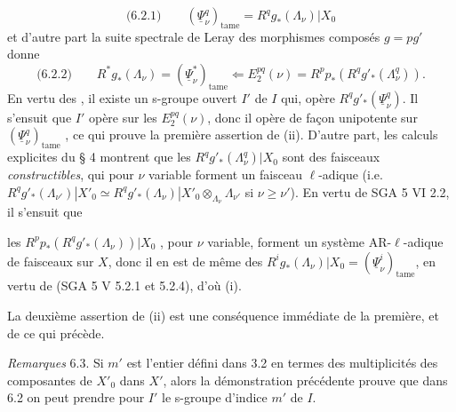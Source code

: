 \documentclass[11pt,a4paper]{article}
\begin{document}
\[
\text{(6.2.1)} \qquad (\underline{\Psi}^q_\nu)_{\mathrm{tame}} = R^q g_*(\Lambda_\nu)|X_0
\]
et  d'autre part la suite spectrale de Leray des morphismes composés $g = p g'$ donne
\[
\text{(6.2.2)} \qquad R^* g_*(\Lambda_\nu) = (\underline{\Psi}^*_\nu)_{\mathrm{tame}} \Longleftarrow E_2^{pq}(\nu) = R^p p_*(R^q g'_*(\Lambda^q_\nu)) .
\]
En vertu des \struck{\ill{}} , il existe un s-groupe ouvert $I'$ de $I$ qui,  opère   $R^q g'_*(\underline{\Psi}^q_\nu)$. Il s'ensuit que $I'$ opère \struck{\ill{}}   sur  les $E_2^{pq}(\nu)$, donc  il opère de façon unipotente   sur $(\underline{\Psi}^q_\nu)_{\mathrm{tame}}$  , ce qui prouve la première assertion de (ii).
D'autre part, les calculs explicites du § 4 montrent que les $R^q g'_*(\Lambda^q_\nu)|X_0$ sont des faisceaux \emph{constructibles}, qui pour $\nu$ variable forment un faisceau \struck{\ill{}} $\ell$-adique (i.e. $R^q g'_*(\Lambda_{\nu'})|X'_0 \simeq R^q g'_*(\Lambda_\nu)|X'_0 \otimes_{\Lambda_\nu} \Lambda_{\nu'}$ si $\nu \geqslant \nu'$). En vertu de SGA 5 VI 2.2, il s'ensuit que


les $R^p p_*(R^q g'_*(\Lambda_\nu))|X_0$ , pour $\nu$ variable, forment un système AR-$\ell$-adique de faisceaux sur $X$, donc il en est de même des $R^i g_*(\Lambda_\nu)|X_0 = (\underline{\Psi}^i_\nu)_{\mathrm{tame}}$, en vertu de (SGA 5 V 5.2.1 et 5.2.4), d'où (i).

La deuxième assertion de (ii)  est une conséquence immédiate de la première, et de ce qui précède.

\emph{Remarques} 6.3. Si $m'$ est l'entier défini dans 3.2 en termes des multiplicités des composantes de $X'_0$ dans $X'$, alors la démonstration précédente prouve que dans 6.2 on peut prendre pour $I'$ le s-groupe  d'indice $m'$ de $I$.
\end{document}
